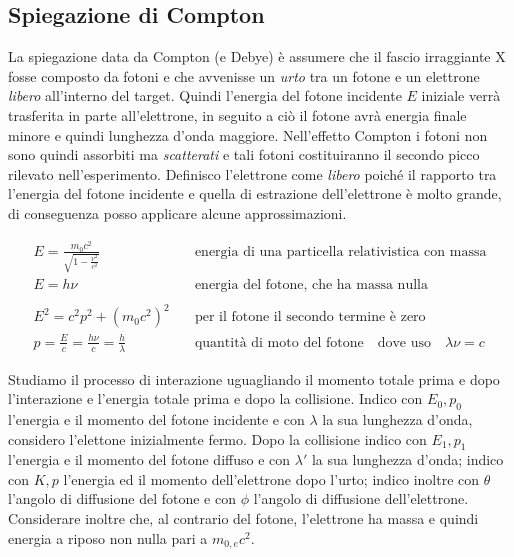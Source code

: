 \subsection{Spiegazione di Compton}

La spiegazione data da Compton (e Debye) è assumere che il fascio irraggiante X fosse composto da fotoni e che avvenisse un \textit{urto} tra un fotone e un elettrone \textit{libero} all'interno del target.
Quindi l'energia del fotone incidente $E$ iniziale verrà trasferita in parte all'elettrone, in seguito a ciò il fotone avrà energia finale minore e quindi lunghezza d'onda maggiore.
Nell'effetto Compton i fotoni non sono quindi assorbiti ma \textit{scatterati} e tali fotoni costituiranno il secondo picco rilevato nell'esperimento.
Definisco l'elettrone come \textit{libero} poiché il rapporto tra l'energia del fotone incidente e quella di estrazione dell'elettrone è molto grande, di conseguenza posso applicare alcune approssimazioni.

\begin{equation}
\begin{split}
E = \frac{ m_0 c^2}{\sqrt{1 - \frac{ v^2}{c^2 }} } & \quad \mbox{energia di una particella relativistica con massa} \\
E = h \nu & \quad \mbox{energia del fotone, che ha massa nulla} \\ \\
E^2 = c^2 p^2 + (m_0 c^2)^2 & \quad \mbox{per il fotone il secondo termine è zero} \\
p = \frac{ E}{c } = \frac{ h \nu}{c } = \frac{ h}{ \lambda} & \quad \mbox{quantità di moto del fotone} \quad \mbox{dove uso} \quad \lambda \nu = c
\end{split}
\end{equation}

Studiamo il processo di interazione uguagliando il momento totale prima e dopo l'interazione e l'energia totale prima e dopo la collisione.
Indico con $E_0, p_0$ l'energia e il momento del fotone incidente e con $\lambda$ la sua lunghezza d'onda, considero l'elettone inizialmente fermo.
Dopo la collisione indico con $E_1, p_1$ l'energia e il momento del fotone diffuso e con $\lambda'$ la sua lunghezza d'onda; 
indico con $K, p$ l'energia ed il momento dell'elettrone dopo l'urto;
indico inoltre con $\theta$ l'angolo di diffusione del fotone e con $\phi$ l'angolo di diffusione dell'elettrone.
Considerare inoltre che, al contrario del fotone, l'elettrone ha massa e quindi energia a riposo non nulla pari a $m_{0,e}c^2$.

